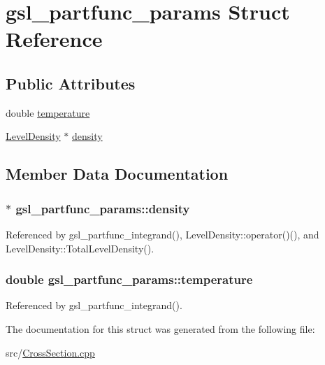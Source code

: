 \hypertarget{structgsl__partfunc__params}{\section{gsl\-\_\-partfunc\-\_\-params Struct Reference}
\label{structgsl__partfunc__params}
}
\subsection*{Public Attributes}
\begin{DoxyCompactItemize}
\item 
double \hyperlink{structgsl__partfunc__params_ae8330967c4990a3497f423816f9ccccf}{temperature}
\item 
\hyperlink{classLevelDensity}{Level\-Density} $\ast$ \hyperlink{structgsl__partfunc__params_adbaf4c10b4af6cc003d74c80895ebfb8}{density}
\end{DoxyCompactItemize}


\subsection{Member Data Documentation}
\hypertarget{structgsl__partfunc__params_adbaf4c10b4af6cc003d74c80895ebfb8}{
\subsubsection[{density}]{$\ast$ gsl\-\_\-partfunc\-\_\-params\-::density}}\label{structgsl__partfunc__params_adbaf4c10b4af6cc003d74c80895ebfb8}


Referenced by gsl\-\_\-partfunc\-\_\-integrand(), Level\-Density\-::operator()(), and Level\-Density\-::\-Total\-Level\-Density().

\hypertarget{structgsl__partfunc__params_ae8330967c4990a3497f423816f9ccccf}{
\subsubsection[{temperature}]{\setlength{\rightskip}{0pt plus 5cm}double gsl\-\_\-partfunc\-\_\-params\-::temperature}}\label{structgsl__partfunc__params_ae8330967c4990a3497f423816f9ccccf}


Referenced by gsl\-\_\-partfunc\-\_\-integrand().



The documentation for this struct was generated from the following file\-:\begin{DoxyCompactItemize}
\item 
src/\hyperlink{CrossSection_8cpp}{Cross\-Section.\-cpp}\end{DoxyCompactItemize}

